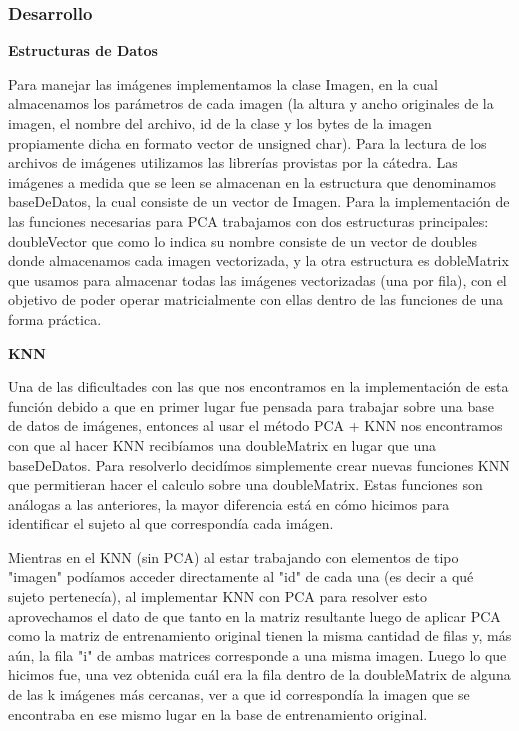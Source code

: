 \subsubsection*{Desarrollo}
\textbf{Estructuras de Datos}

Para manejar las imágenes implementamos la clase Imagen, en la cual almacenamos los parámetros de cada imagen (la altura y ancho originales de la imagen, el nombre del archivo, id de la clase y los bytes de la imagen propiamente dicha en formato vector de unsigned char).
Para la lectura de los archivos de imágenes utilizamos las librerías provistas por la cátedra.
Las imágenes a medida que se leen se almacenan en la estructura que denominamos baseDeDatos, la cual consiste de un vector de Imagen.
Para la implementación de las funciones necesarias para PCA trabajamos con dos estructuras principales: doubleVector que como lo indica su nombre consiste de un vector de doubles donde almacenamos cada imagen vectorizada, y la otra estructura es dobleMatrix que usamos para almacenar todas las imágenes vectorizadas (una por fila), con el objetivo de poder operar matricialmente con ellas dentro de las funciones de una forma práctica.

\textbf{KNN}

Una de las dificultades con las que nos encontramos en la implementación de esta función debido a que en primer lugar fue pensada para trabajar sobre una base de datos de imágenes, entonces al usar el método PCA + KNN nos encontramos con que al hacer KNN recibíamos una doubleMatrix en lugar que una baseDeDatos.
Para resolverlo decidímos simplemente crear nuevas funciones KNN que permitieran hacer el calculo sobre una doubleMatrix. Estas funciones son análogas a las anteriores, la mayor diferencia está en cómo hicimos para identificar el sujeto al que correspondía cada imágen.

Mientras en el KNN (sin PCA) al estar trabajando con elementos de tipo "imagen" podíamos acceder directamente al "id" de cada una (es decir a qué sujeto pertenecía), al implementar KNN con PCA para resolver esto aprovechamos el dato de que tanto en la matriz resultante luego de aplicar PCA como la matriz de entrenamiento original tienen la misma cantidad de filas y, más aún, la fila "i" de ambas matrices corresponde a una misma imagen.
Luego lo que hicimos fue, una vez obtenida cuál era la fila dentro de la doubleMatrix de alguna de las k imágenes más cercanas, ver a que id correspondía la imagen que se encontraba en ese mismo lugar en la base de entrenamiento original. 


